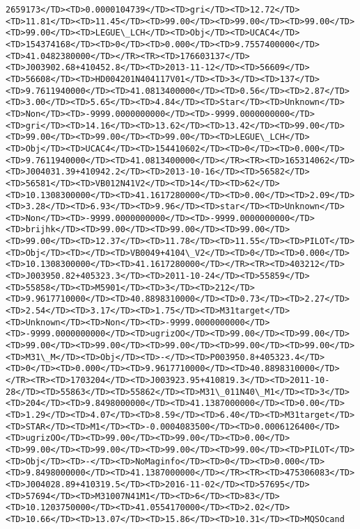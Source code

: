 \documentclass[11pt]{article}
\begin{document}
\begin{Verbatim}[commandchars=\\\{\}]
2659173</TD><TD>0.0000104739</TD><TD>gri</TD><TD>12.72</TD><TD>11.81</TD><TD>11.45</TD><TD>99.00</TD><TD>99.00</TD><TD>99.00</TD><TD>99.00</TD><TD>LEGUE\_LCH</TD><TD>Obj</TD><TD>UCAC4</TD><TD>154374168</TD><TD>0</TD><TD>0.000</TD><TD>9.7557400000</TD><TD>41.0482380000</TD></TR><TR><TD>176603137</TD><TD>J003902.68+410452.8</TD><TD>2013-11-12</TD><TD>56609</TD><TD>56608</TD><TD>HD004201N404117V01</TD><TD>3</TD><TD>137</TD><TD>9.7611940000</TD><TD>41.0813400000</TD><TD>0.56</TD><TD>2.87</TD><TD>3.00</TD><TD>5.65</TD><TD>4.84</TD><TD>Star</TD><TD>Unknown</TD><TD>Non</TD><TD>-9999.0000000000</TD><TD>-9999.0000000000</TD><TD>gri</TD><TD>14.16</TD><TD>13.62</TD><TD>13.42</TD><TD>99.00</TD><TD>99.00</TD><TD>99.00</TD><TD>99.00</TD><TD>LEGUE\_LCH</TD><TD>Obj</TD><TD>UCAC4</TD><TD>154410602</TD><TD>0</TD><TD>0.000</TD><TD>9.7611940000</TD><TD>41.0813400000</TD></TR><TR><TD>165314062</TD><TD>J004031.39+410942.2</TD><TD>2013-10-16</TD><TD>56582</TD><TD>56581</TD><TD>VB012N41V2</TD><TD>14</TD><TD>62</TD><TD>10.1308300000</TD><TD>41.1617280000</TD><TD>0.00</TD><TD>2.09</TD><TD>3.28</TD><TD>6.93</TD><TD>9.96</TD><TD>star</TD><TD>Unknown</TD><TD>Non</TD><TD>-9999.0000000000</TD><TD>-9999.0000000000</TD><TD>brijhk</TD><TD>99.00</TD><TD>99.00</TD><TD>99.00</TD><TD>99.00</TD><TD>12.37</TD><TD>11.78</TD><TD>11.55</TD><TD>PILOT</TD><TD>Obj</TD><TD></TD><TD>VB0049+4104\_V2</TD><TD>0</TD><TD>0.000</TD><TD>10.1308300000</TD><TD>41.1617280000</TD></TR><TR><TD>403212</TD><TD>J003950.82+405323.3</TD><TD>2011-10-24</TD><TD>55859</TD><TD>55858</TD><TD>M5901</TD><TD>3</TD><TD>212</TD><TD>9.9617710000</TD><TD>40.8898310000</TD><TD>0.73</TD><TD>2.27</TD><TD>2.54</TD><TD>3.17</TD><TD>1.75</TD><TD>M31target</TD><TD>Unknown</TD><TD>Non</TD><TD>-9999.0000000000</TD><TD>-9999.0000000000</TD><TD>ugrizOO</TD><TD>99.00</TD><TD>99.00</TD><TD>99.00</TD><TD>99.00</TD><TD>99.00</TD><TD>99.00</TD><TD>99.00</TD><TD>M31\_M</TD><TD>Obj</TD><TD>-</TD><TD>P003950.8+405323.4</TD><TD>0</TD><TD>0.000</TD><TD>9.9617710000</TD><TD>40.8898310000</TD></TR><TR><TD>1703204</TD><TD>J003923.95+410819.3</TD><TD>2011-10-28</TD><TD>55863</TD><TD>55862</TD><TD>M31\_011N40\_M1</TD><TD>3</TD><TD>204</TD><TD>9.8498000000</TD><TD>41.1387000000</TD><TD>0.00</TD><TD>1.29</TD><TD>4.07</TD><TD>8.59</TD><TD>6.40</TD><TD>M31target</TD><TD>STAR</TD><TD>M1</TD><TD>-0.0004083500</TD><TD>0.0006126400</TD><TD>ugrizOO</TD><TD>99.00</TD><TD>99.00</TD><TD>0.00</TD><TD>99.00</TD><TD>99.00</TD><TD>99.00</TD><TD>99.00</TD><TD>PILOT</TD><TD>Obj</TD><TD>-</TD><TD>NoMaginfo</TD><TD>0</TD><TD>0.000</TD><TD>9.8498000000</TD><TD>41.1387000000</TD></TR><TR><TD>475306083</TD><TD>J004028.89+410319.5</TD><TD>2016-11-02</TD><TD>57695</TD><TD>57694</TD><TD>M31007N41M1</TD><TD>6</TD><TD>83</TD><TD>10.1203750000</TD><TD>41.0554170000</TD><TD>2.02</TD><TD>10.66</TD><TD>13.07</TD><TD>15.86</TD><TD>10.31</TD><TD>MQSOcand  
\end{Verbatim}
\end{document}
